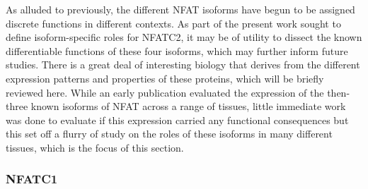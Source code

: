As alluded to previously, the different NFAT isoforms have begun to be assigned discrete functions in different contexts. As part of the present work sought to define isoform-specific roles for NFATC2, it may be of utility to dissect the known differentiable functions of these four isoforms, which may further inform future studies. There is a great deal of interesting biology that derives from the different expression patterns and properties of these proteins, which will be briefly reviewed here. While an early publication \citep{Masuda1995} evaluated the expression of the then\hyp{}three known isoforms of NFAT across a range of tissues, little immediate work was done to evaluate if this expression carried any functional consequences but this set off a flurry of study on the roles of these isoforms in many different tissues, which is the focus of this section. 

\subsubsection{NFATC1}\label{nfatc1}

